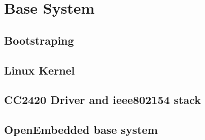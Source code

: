 \chapter{Base System}
\section{Bootstraping}
\section{Linux Kernel}
\section{CC2420 Driver and ieee802154 stack}
\section{OpenEmbedded base system}
